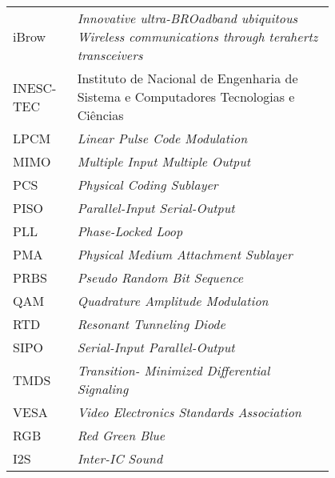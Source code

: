 \begin{flushleft}
\begin{tabular}{l p{0.8\linewidth}}
iBrow 		&	\textit{Innovative ultra-BROadband ubiquitous Wireless communications through terahertz transceivers}	\\
INESC-TEC	&	Instituto de Nacional de Engenharia de Sistema e Computadores Tecnologias e Ciências					\\
LPCM 		&	\textit{Linear Pulse Code Modulation}																	\\
MIMO		&	\textit{Multiple Input Multiple Output}																	\\
PCS			&	\textit{Physical Coding Sublayer}																		\\	
PISO		&	\textit{Parallel-Input Serial-Output}																	\\
PLL			&	\textit{Phase-Locked Loop}																				\\
PMA			&	\textit{Physical Medium Attachment Sublayer}															\\
PRBS		&	\textit{Pseudo Random Bit Sequence}																		\\
QAM			&	\textit{Quadrature Amplitude Modulation}																\\
RTD			&	\textit{Resonant Tunneling Diode}																		\\
SIPO		&	\textit{Serial-Input Parallel-Output}																	\\
TMDS		&	\textit{Transition- Minimized Differential Signaling}													\\
VESA		&	\textit{Video Electronics Standards Association}														\\
RGB			&	\textit{Red Green Blue}																									\\
I2S				&	\textit{Inter-IC Sound	}																											
\end{tabular}
\end{flushleft}

